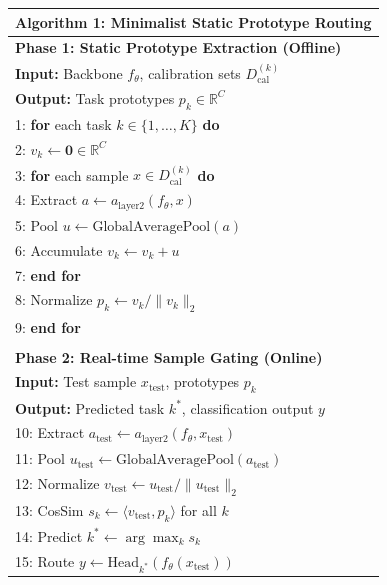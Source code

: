 \documentclass{article}
\theoremstyle{plain}
\theoremstyle{definition}
\theoremstyle{remark}
\begin{document}
\begin{table}[ht]
\centering
\small
\begin{tabular}{l}
\toprule
\textbf{Algorithm 1: Minimalist Static Prototype Routing} \\
\midrule
\textbf{Phase 1: Static Prototype Extraction (Offline)} \\
\textbf{Input:} Backbone $f_{\theta}$, calibration sets $D_{\text{cal}}^{(k)}$ \\
\textbf{Output:} Task prototypes $p_k \in \mathbb{R}^C$ \\
1: \textbf{for} each task $k \in \{1, \dots, K\}$ \textbf{do} \\
2: \quad $v_k \leftarrow \mathbf{0} \in \mathbb{R}^C$ \\
3: \quad \textbf{for} each sample $x \in D_{\text{cal}}^{(k)}$ \textbf{do} \\
4: \quad \quad Extract $a \leftarrow a_{\text{layer2}}(f_{\theta}, x)$ \\
5: \quad \quad Pool $u \leftarrow \text{GlobalAveragePool}(a)$ \\
6: \quad \quad Accumulate $v_k \leftarrow v_k + u$ \\
7: \quad \textbf{end for} \\
8: \quad Normalize $p_k \leftarrow v_k / \|v_k\|_2$ \\
9: \textbf{end for} \\
\\
\textbf{Phase 2: Real-time Sample Gating (Online)} \\
\textbf{Input:} Test sample $x_{\text{test}}$, prototypes $p_k$ \\
\textbf{Output:} Predicted task $k^*$, classification output $y$ \\
10: Extract $a_{\text{test}} \leftarrow a_{\text{layer2}}(f_{\theta}, x_{\text{test}})$ \\
11: Pool $u_{\text{test}} \leftarrow \text{GlobalAveragePool}(a_{\text{test}})$ \\
12: Normalize $v_{\text{test}} \leftarrow u_{\text{test}} / \|u_{\text{test}}\|_2$ \\
13: CosSim $s_k \leftarrow \langle v_{\text{test}}, p_k \rangle$ for all $k$ \\
14: Predict $k^* \leftarrow \arg\max_{k} s_k$ \\
15: Route $y \leftarrow \text{Head}_{k^*}(f_{\theta}(x_{\text{test}}))$ \\
\bottomrule
\end{tabular}
\end{table}
\end{document}
